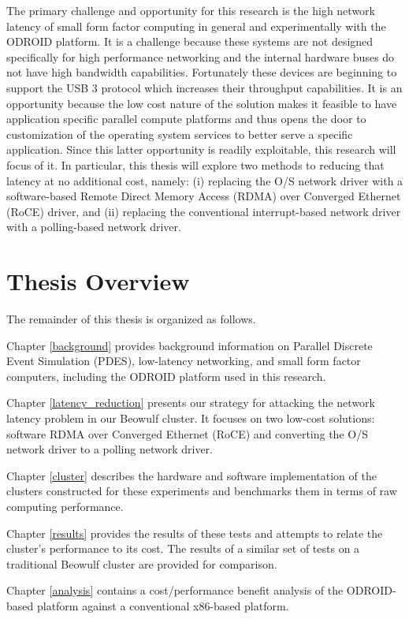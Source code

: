 \documentclass[11pt]{book}
\begin{document}
The primary challenge and opportunity for this research is the high network latency of
small form factor computing in general and experimentally with the ODROID platform.  It is
a challenge because these systems are not designed specifically for high performance
networking and the internal hardware buses do not have high bandwidth capabilities.
Fortunately these devices are beginning to support the USB 3 protocol which increases
their throughput capabilities.  It is an opportunity because the low cost nature of the
solution makes it feasible to have application specific parallel compute platforms and
thus opens the door to customization of the operating system services to better serve a
specific application.  Since this latter opportunity is readily exploitable, this research
will focus of it.  In particular, this thesis will explore two methods to reducing that
latency at no additional cost, namely: (i) replacing the O/S network driver with a
software-based Remote Direct Memory Access (RDMA) over Converged Ethernet (RoCE) driver,
and (ii) replacing the conventional interrupt-based network driver with a polling-based
network driver.

\section{Thesis Overview}

The remainder of this thesis is organized as follows.

Chapter \ref{background} provides background information on Parallel Discrete Event
Simulation (PDES), low-latency networking, and small form factor computers, including the
ODROID platform used in this research.

Chapter \ref{latency_reduction} presents our strategy for attacking the network latency
problem in our Beowulf cluster.  It focuses on two low-cost solutions: software RDMA over
Converged Ethernet (RoCE) and converting the O/S network driver to a polling network
driver. 

Chapter \ref{cluster} describes the hardware and software implementation of the clusters
constructed for these experiments and benchmarks them in terms of raw computing
performance.

Chapter \ref{results} provides the results of these tests and attempts to relate the
cluster's performance to its cost.  The results of a similar set of tests on a traditional
Beowulf cluster are provided for comparison.

Chapter \ref{analysis} contains a cost/performance benefit analysis of the ODROID-based
platform against a conventional x86-based platform.  
\end{document}

